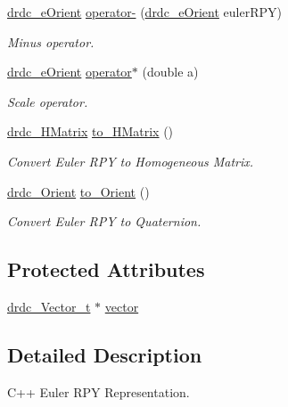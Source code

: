 \begin{CompactItemize}
\hyperlink{classdrdc__eOrient}{drdc\_\-eOrient} \hyperlink{classdrdc__eOrient_ea687019fd89fc60dd6987df7eb79ba5}{operator-} (\hyperlink{classdrdc__eOrient}{drdc\_\-eOrient} eulerRPY)
\begin{CompactList}\small\item\em Minus operator. \item\end{CompactList}\item 
\hyperlink{classdrdc__eOrient}{drdc\_\-eOrient} \hyperlink{classdrdc__eOrient_5a545bb7cc5415d5f6ada753353a4649}{operator$\ast$} (double a)
\begin{CompactList}\small\item\em Scale operator. \item\end{CompactList}\item 
\hyperlink{classdrdc__HMatrix}{drdc\_\-HMatrix} \hyperlink{classdrdc__eOrient_9e84a33ac930ed1b3b9d8a124025ffdd}{to\_\-HMatrix} ()
\begin{CompactList}\small\item\em Convert Euler RPY to Homogeneous Matrix. \item\end{CompactList}\item 
\hyperlink{classdrdc__Orient}{drdc\_\-Orient} \hyperlink{classdrdc__eOrient_e7ece991434258af7eed20910a725759}{to\_\-Orient} ()
\begin{CompactList}\small\item\em Convert Euler RPY to Quaternion. \item\end{CompactList}\end{CompactItemize}
\subsection*{Protected Attributes}
\begin{CompactItemize}
\item 
\hyperlink{structdrdc__Vector__t}{drdc\_\-Vector\_\-t} $\ast$ \hyperlink{classdrdc__eOrient_3c20a6d621dbcb6b4a52a25843f081e6}{vector}
\end{CompactItemize}


\subsection{Detailed Description}
C++ Euler RPY Representation. 



